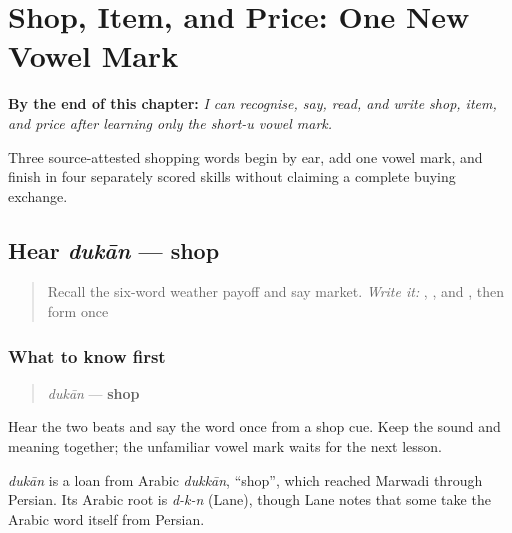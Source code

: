 
\chapter{Shop, Item, and Price: One New Vowel Mark}
\label{ch:mw-shopping-three}

\begin{chapteropening}
\textbf{By the end of this chapter:} \emph{I can recognise, say, read, and write shop, item, and price after learning only the short-u vowel mark.}

Three source-attested shopping words begin by ear, add one vowel mark, and finish in four separately scored skills without claiming a complete buying exchange.
\end{chapteropening}

\section[dukān]{Hear \emph{dukān} — shop}

\label{lesson:MW-C13-hear-dukan}



\begin{quote}
Recall the six-word weather payoff and say market. \emph{Write it:} \textbf{}, \textbf{}, and \textbf{}, then form \textbf{} once
\end{quote}

\subsection*{What to know first}
\begin{quote}
\emph{dukān} — \textbf{shop}
\end{quote}

Hear the two beats and say the word once from a shop cue. Keep the sound and meaning together; the unfamiliar vowel mark waits for the next lesson.

\begin{cousinweb}
\emph{dukān} is a loan from Arabic \emph{dukkān}, \textquotedblleft{}shop\textquotedblright{}, which reached Marwadi through Persian. Its Arabic root is \emph{d-k-n} (Lane), though Lane notes that some take the Arabic word itself from Persian.
\end{cousinweb}

